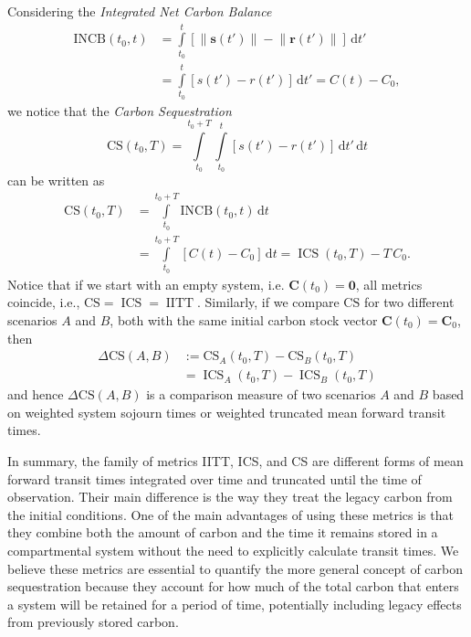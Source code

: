 \documentclass[ProofPDF]{./Styles/Jnls-Template-V3}
\newcommand{\CS}{\mathrm{CS}}
\newcommand{\INCB}{\mathrm{INCB}}
\newcommand{\IITT}{\operatorname{IITT}}
\newcommand{\ICS}{\operatorname{ICS}}
\newcommand{\intl}{\int\limits}
\newcommand{\dd}[1]{\,\mathrm{d}#1}
\renewcommand{\vec}[1]{\mathbf{#1}}
\newcommand{\vnorm}[1]{\left\|#1\right\|}
\begin{document}
Considering the {\it Integrated Net Carbon Balance}
\begin{equation}
    \begin{aligned}
        \INCB(t_0,t) &= \intl_{t_0}^{t}\left[\vnorm{\vec{s}(t')}-\vnorm{\vec{r}(t')}\right]\dd{t'} \\
        &= \intl_{t_0}^t \left[s(t')-r(t')\right]\dd{t'} = C(t)-C_0,
    \end{aligned}
\end{equation}
we notice that the {\it Carbon Sequestration}
\begin{equation}
    \CS(t_0,T) = \intl_{t_0}^{t_0+T} \intl_{t_0}^t \left[s(t')-r(t')\right]\dd{t'}\dd{t}
\end{equation}
can be written as
\begin{equation}
    \begin{aligned}
        \CS(t_0,T)& = \intl_{t_0}^{t_0+T} \INCB(t_0,t)\dd{t}\\ 
        &= \intl_{t_0}^{t_0+T} \left[C(t) - C_0\right]\dd{t} = \ICS(t_0,T) - T\,C_0.
     \end{aligned}
\end{equation}
Notice that if we start with an empty system, i.e. $\vec{C}(t_0) = \vec{0}$, all metrics coincide, i.e.,  $\CS = \ICS = \IITT$. 
Similarly, if we compare $\CS$ for two different scenarios $A$ and $B$, both with the same initial carbon stock vector $\vec{C}(t_0)=\vec{C}_0$, then
\begin{equation}
    \label{eqn:Delta_CS}
    \begin{aligned}
        \Delta\CS(A,B)& := \CS_A(t_0,T) - \CS_B(t_0,T)\\ 
        &= \ICS_A(t_0,T) - \ICS_B(t_0,T)
    \end{aligned}
\end{equation}
and hence $\Delta\CS(A,B)$ is a comparison measure of two scenarios $A$ and $B$ based on weighted system sojourn times or weighted truncated mean forward transit times.

In summary, the family of metrics IITT, ICS, and CS are different forms of mean forward transit times integrated over time and truncated until the time of observation. Their main difference is the way they treat the legacy carbon from the initial conditions. One of the main advantages of using these metrics is that they combine both the amount of carbon and the time it remains stored in a compartmental system without the need to explicitly calculate transit times. We believe these metrics are essential to quantify the more general concept of carbon sequestration because they account for how much of the total carbon that enters a system will be retained for a period of time, potentially including legacy effects from previously stored carbon. 
\end{document}
